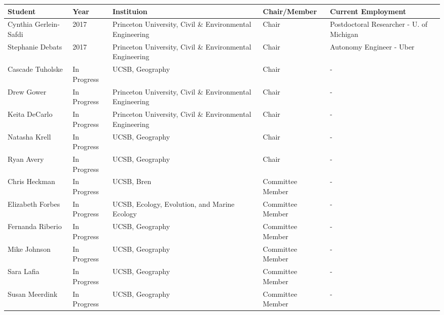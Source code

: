 
\begin{longtable}{lp{1.5cm} p{4.5cm}p{2cm}p{4cm}}
Student & Year & Instituion & Chair/Member & Current Employment\\
\hline 
\endhead 
Cynthia Gerlein-Safdi & 2017 & Princeton University, Civil \& Environmental Engineering & Chair & Postdoctoral Researcher - U. of Michigan\\
Stephanie Debats & 2017 & Princeton University, Civil \& Environmental Engineering & Chair & Autonomy Engineer - Uber\\
Cascade Tuholske & In Progress & UCSB, Geography & Chair &  - \\
Drew Gower & In Progress & Princeton University, Civil \& Environmental Engineering & Chair &  - \\
Keita DeCarlo & In Progress & Princeton University, Civil \& Environmental Engineering & Chair &  - \\
Natasha Krell & In Progress & UCSB, Geography & Chair &  - \\
Ryan Avery & In Progress & UCSB, Geography & Chair &  - \\
Chris Heckman & In Progress & UCSB, Bren & Committee Member &  - \\
Elizabeth Forbes & In Progress & UCSB, Ecology, Evolution, and Marine Ecology & Committee Member &  - \\
Fernanda Riberio & In Progress & UCSB, Geography & Committee Member &  - \\
Mike Johnson & In Progress & UCSB, Geography & Committee Member &  - \\
Sara Lafia & In Progress & UCSB, Geography & Committee Member &  - \\
Susan Meerdink & In Progress & UCSB, Geography & Committee Member &  - \\
\end{longtable}

